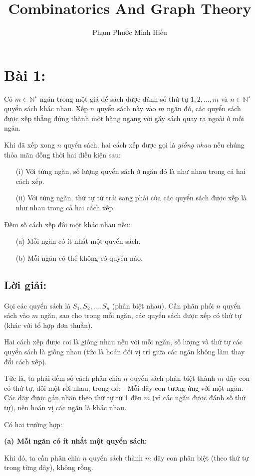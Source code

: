 \documentclass{article}
\title{Combinatorics And Graph Theory}
\author{Phạm Phước Minh Hiếu}
\begin{document}
	\section*{Bài 1:}
	Có $m \in \mathbb{N}^\star$ ngăn trong một giá để sách được đánh số thứ tự $1, 2, \ldots, m$ và $n \in \mathbb{N}^\star$ quyển sách khác nhau. Xếp $n$ quyển sách này vào $m$ ngăn đó, các quyển sách được xếp thẳng đứng thành một hàng ngang với gáy sách quay ra ngoài ở mỗi ngăn.
	
	\smallskip
	Khi đã xếp xong $n$ quyển sách, hai cách xếp được gọi là \textit{giống nhau} nếu chúng thỏa mãn đồng thời hai điều kiện sau:
	\begin{itemize}
		\item[(i)] Với từng ngăn, số lượng quyển sách ở ngăn đó là như nhau trong cả hai cách xếp.
		\item[(ii)] Với từng ngăn, thứ tự từ trái sang phải của các quyển sách được xếp là như nhau trong cả hai cách xếp.
	\end{itemize}
	
	\smallskip
	Đếm số cách xếp đôi một khác nhau nếu:
	\begin{itemize}
		\item[(a)] Mỗi ngăn có ít nhất một quyển sách.
		\item[(b)] Mỗi ngăn có thể không có quyển nào.
	\end{itemize}
	
	\subsection*{Lời giải:}
	Gọi các quyển sách là $S_1, S_2, \ldots, S_n$ (phân biệt nhau). Cần phân phối $n$ quyển sách vào $m$ ngăn, sao cho trong mỗi ngăn, các quyển sách được xếp có thứ tự (khác với tổ hợp đơn thuần).
	
	Hai cách xếp được coi là giống nhau nếu với mỗi ngăn, số lượng và thứ tự các quyển sách là giống nhau (tức là hoán đổi vị trí giữa các ngăn không làm thay đổi cách xếp).
	
	Tức là, ta phải đếm số cách phân chia $n$ quyển sách phân biệt thành $m$ dãy con có thứ tự, đôi một rời nhau, trong đó:
	- Mỗi dãy con tương ứng với một ngăn.
	- Các dãy được gán nhãn theo thứ tự từ 1 đến $m$ (vì các ngăn được đánh số thứ tự), nên hoán vị các ngăn là khác nhau.
	
	Có hai trường hợp:
	
	\noindent\textbf{(a) Mỗi ngăn có ít nhất một quyển sách:}
	
	Khi đó, ta cần phân chia $n$ quyển sách thành $m$ dãy con phân biệt (theo thứ tự trong từng dãy), không rỗng.
	
\end{document}
